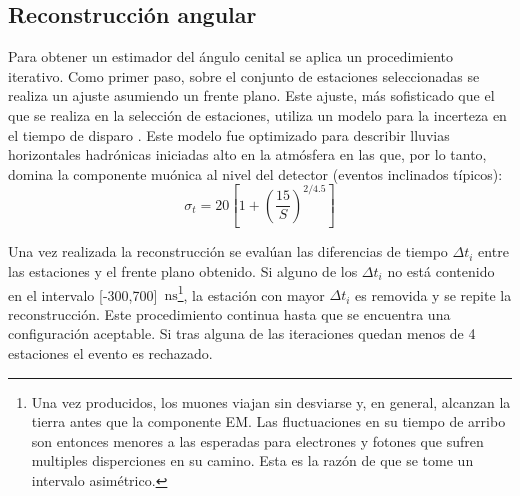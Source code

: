 	\subsection{Reconstrucción angular}
	\label{sbsc:thetaRec}
	
	Para obtener un estimador del ángulo cenital se aplica un procedimiento iterativo.
	Como primer paso, sobre el conjunto de estaciones seleccionadas se realiza un ajuste asumiendo un frente plano.
	Este ajuste, más sofisticado que el que se realiza en la selección de estaciones, utiliza un modelo para la incerteza en el tiempo de disparo \cite{cite:ines}.
	Este modelo fue optimizado para describir lluvias horizontales hadrónicas iniciadas alto en la atmósfera en las que, por lo tanto, domina la componente muónica al nivel del detector (eventos inclinados típicos):
	\begin{equation}
	\sigma_t = 20 \left[ 1 + \left( \frac{15}{S} \right)^{2/4.5} \right]
	\label{ec:varT} 
	\end{equation}

	

	Una vez realizada la reconstrucción se evalúan las diferencias de tiempo $\Delta t_i$ entre las estaciones y el frente plano obtenido.
	Si alguno de los $\Delta t_i$ no está contenido en el intervalo [-300,700]~$\mbox{ns}$\footnote{
	Una vez producidos, los muones viajan sin desviarse y, en general, alcanzan la tierra antes que la componente EM. Las fluctuaciones en su tiempo de arribo son entonces menores a las esperadas para electrones y fotones que sufren multiples disperciones en su camino. Esta es la razón de que se tome un intervalo asimétrico.
	},
	la estación con mayor $\Delta t_i$ es removida y se repite la reconstrucción. Este procedimiento continua hasta que se encuentra una configuración aceptable.
	Si tras alguna de las iteraciones quedan menos de 4 estaciones el evento es rechazado.
	
